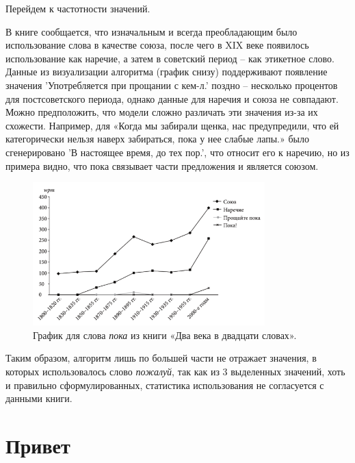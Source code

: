 Перейдем к частотности значений.

В книге сообщается, что изначальным и всегда преобладающим было использование слова в качестве
союза, после чего в XIX веке появилось использование как наречие, а затем в советский период
– как этикетное слово.
Данные из визуализации алгоритма (график снизу) поддерживают появление значения
’Употребляется при прощании с кем-л.’
поздно – несколько процентов для постсоветского периода, однако данные для наречия и союза
не совпадают.
Можно предположить, что модели сложно различать эти значения из-за их схожести.
Например, для
«Когда мы забирали щенка, нас предупредили, что ей категорически нельзя наверх забираться,
пока у нее слабые лапы.»
было сгенерировано ’В настоящее время, до тех пор.’,
что относит его к наречию,
но из примера видно, что пока связывает части предложения и является союзом.

\begin{figure}[H]
    \centering %
    \includegraphics[width=0.8\textwidth]{img/book/poka/all}
    \caption{График для слова \textit{пока} из книги «Два века в двадцати словах».}
\end{figure}

Таким образом, алгоритм лишь по большей части не отражает значения, в которых использовалось
слово \textit{пожалуй}, так как из 3 выделенных значений, хоть и правильно сформулированных,
статистика использования не согласуется с данными книги.

\section*{Привет}

